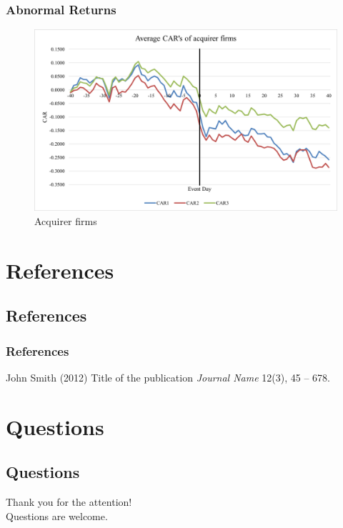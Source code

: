 \documentclass{beamer}
\begin{document}
\begin{frame}
\frametitle{Abnormal Returns }
\begin{figure}[H]
	\centering
	\includegraphics[scale=0.4]{images/Bild2.png}
	\caption{Acquirer firms}
	\label{bildlyacqui}
\end{figure}
\end{frame}

\section{References}
\subsection{References}
\begin{frame}
\frametitle{References}
\footnotesize{
\begin{thebibliography}{99} %
 John Smith (2012)
\newblock Title of the publication
\newblock \emph{Journal Name} 12(3), 45 -- 678.
\end{thebibliography}
}
\end{frame}

\section{Questions}
\subsection{Questions}
\begin{frame}
	\begin{center}
		\Large{
			Thank you for the attention! \\
			Questions are welcome.}
	\end{center}

\end{frame}

\end{document}
